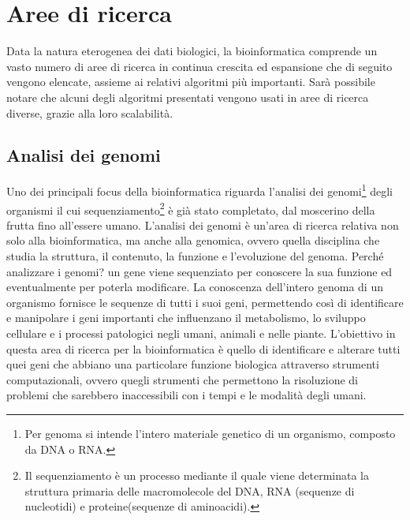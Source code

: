\section{Aree di ricerca}
Data la natura eterogenea dei dati biologici, la bioinformatica comprende un vasto numero di aree di ricerca in continua crescita ed espansione che di seguito vengono elencate, assieme ai relativi algoritmi più importanti. 
\newline
Sarà possibile notare che alcuni degli algoritmi presentati vengono usati in aree di ricerca diverse, grazie alla loro scalabilità.

\subsection{Analisi dei genomi}
Uno dei principali focus della bioinformatica riguarda l'analisi dei genomi\footnote{Per genoma si intende l'intero materiale genetico di un organismo, composto da DNA o RNA.} degli organismi il cui sequenziamento\footnote{Il sequenziamento è un processo mediante il quale viene determinata la struttura primaria delle macromolecole del DNA, RNA (sequenze di nucleotidi) e proteine(sequenze di aminoacidi).} è già stato completato, dal moscerino della frutta fino all'essere umano. L'analisi dei genomi è un'area di ricerca relativa non solo alla bioinformatica, ma anche alla genomica, ovvero quella disciplina che studia la struttura, il contenuto, la funzione e l'evoluzione del genoma.
\newline
Perché analizzare i genomi? un gene viene sequenziato per conoscere la sua funzione ed eventualmente per poterla modificare. La conoscenza dell'intero genoma di un organismo fornisce le sequenze di tutti i suoi geni, permettendo così di identificare e manipolare i geni importanti che influenzano il metabolismo, lo sviluppo cellulare e i processi patologici negli umani, animali e nelle piante.
\newline
L'obiettivo in questa area di ricerca per la bioinformatica è quello di identificare e alterare tutti quei geni che abbiano una particolare funzione biologica attraverso strumenti computazionali, ovvero quegli strumenti che permettono la risoluzione di problemi che sarebbero inaccessibili con i tempi e le modalità degli umani.

